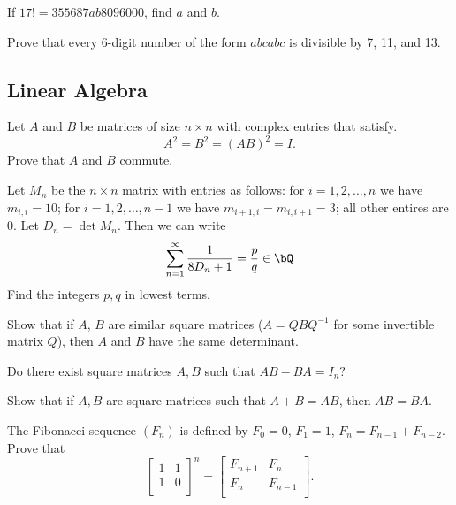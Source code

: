 \documentclass[12pt]{article}
\begin{document}
        \begin{exercise}
            If \(17!=355687ab8096000\), find \(a\) and \(b\).
        \end{exercise}
    
        \begin{exercise}
            Prove that every 6-digit number of the form \(abcabc\) is divisible by 7, 11, and 13.
        \end{exercise}

    \subsection{Linear Algebra}

        \begin{exercise}
            Let \(A\) and  \(B\) be matrices of size \(n\times n\) with complex entries that satisfy.
            \[A^2 = B^2 = (AB)^2 = I.\]
            Prove that \(A\) and \(B\) commute.
        \end{exercise}

        \begin{exercise}
            Let \(M_n\) be the \(n\times n\) matrix with entries as follows: for \(i=1,2,\ldots,n\) we have \(m_{i,i}=10\); for \(i=1,2,\ldots,n-1\) we have \(m_{i+1,i}=m_{i,i+1}=3\); all other entires are 0.
            Let \(D_n=\det M_n\).
            Then we can write
            \[\sum_{n=1}^\infty \frac{1}{8D_n+1} = \frac{p}{q}\in\bQ\]
            Find the integers \(p,q\) in lowest terms.
        \end{exercise}

        \begin{exercise}
            Show that if $A$, $B$ are similar square matrices ($A = QBQ^{-1}$ for some invertible matrix $Q$), then $A$ and $B$ have the same determinant.   
        \end{exercise}

        \begin{exercise}
            Do there exist square matrices $A, B$ such that $AB - BA = I_{n}?$  
        \end{exercise}
        
        \begin{exercise}
            Show that if $A, B$ are square matrices such that $A + B = AB$, then $AB = BA$. 
        \end{exercise}
        
        \begin{exercise}
        The Fibonacci sequence $(F_{n})$ is defined by $F_{0} = 0$, $F_{1} = 1$, $F_{n} = F_{n - 1} + F_{n - 2}$. Prove that 
        \[\begin{bmatrix}
            1&1\\
            1&0\\
        \end{bmatrix}^{n} = \begin{bmatrix}
            F_{n + 1}&F_{n}\\
            F_{n}&F_{n - 1}\\
            \end{bmatrix}.
        \]
        \end{exercise}
        
\end{document}

